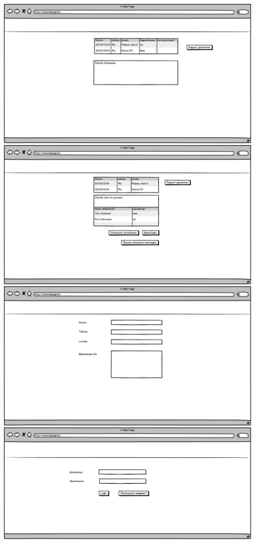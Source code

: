 \documentclass[]{article}
\begin{document}
\includegraphics[scale=0.4]{mockups/infosessies_autolener.png}
\includegraphics[scale=0.4]{mockups/infosessies_beheerder.png}
\includegraphics[scale=0.4]{mockups/infosessies_toevoegen.png}
\includegraphics[scale=0.4]{mockups/login.png}
\end{document}
